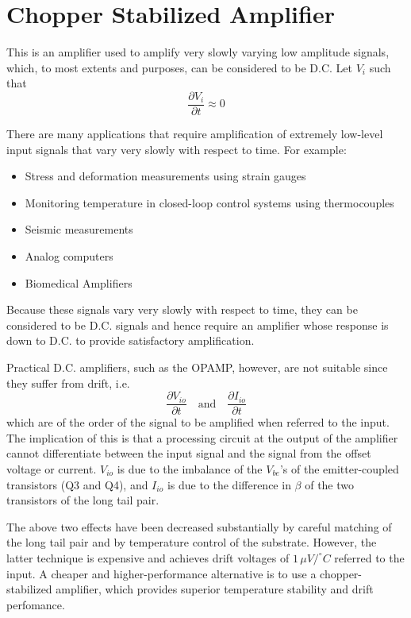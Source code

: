 \documentclass[a4paper,9pt,twoside,openany,twocolumn]{memoir}
\begin{document}
\chapter{Chopper Stabilized Amplifier}
This is an amplifier used to amplify very slowly varying low amplitude signals, which, to most extents and purposes, can be considered to be D.C.
Let $V_i$ such that 
\[
\frac{\partial V_i}{\partial t} \approx 0
\]

There are many applications that require amplification of extremely low-level input signals that vary very slowly with respect to time. For example:
\begin{itemize}
    \item Stress and deformation measurements using strain gauges
    \item Monitoring temperature in closed-loop control systems using thermocouples
    \item Seismic measurements
    \item Analog computers
    \item Biomedical Amplifiers
\end{itemize}

Because these signals vary very slowly with respect to time, they can be considered to be D.C. signals and hence require an amplifier whose response is down to D.C. to provide satisfactory amplification.

Practical D.C. amplifiers, such as the OPAMP, however, are not suitable since they suffer from drift, i.e. 
\[
\frac{\partial V_{io}}{\partial t} \quad \text{and} \quad \frac{\partial I_{io}}{\partial t}
\]
which are of the order of the signal to be amplified when referred to the input. The implication of this is that a processing circuit at the output of the amplifier cannot differentiate between the input signal and the signal from the offset voltage or current. $V_{io}$ is due to the imbalance of the $V_{be}$'s of the emitter-coupled transistors (Q3 and Q4), and $I_{io}$ is due to the difference in $\beta$ of the two transistors of the long tail pair.

The above two effects have been decreased substantially by careful matching of the long tail pair and by temperature control of the substrate. However, the latter technique is expensive and achieves drift voltages of $1 \, \mu V/^\circ C$ referred to the input.
A cheaper and higher-performance alternative is to use a chopper-stabilized amplifier, which provides superior temperature stability and drift perfomance.
\end{document}
